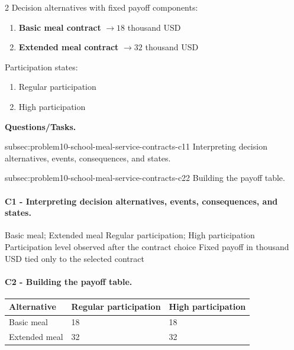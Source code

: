 	\begin{multicols}{2}
		Decision alternatives with fixed payoff components:
		\begin{enumerate}[label=\arabic*.]
			\item \textbf{Basic meal contract} $\to 18$ thousand USD
			\item \textbf{Extended meal contract} $\to 32$ thousand USD
		\end{enumerate}

			\columnbreak

		Participation states:
		\begin{enumerate}[label=\arabic*.]
			\item Regular participation
			\item High participation
		\end{enumerate}
	\end{multicols}

	\textbf{Questions/Tasks.}
	\begin{enumerate}
		\CriterionTask
		{subsec:problem10-school-meal-service-contracts-c1}{1}
		{Interpreting decision alternatives, events, consequences, and states.}

		\CriterionTask
		{subsec:problem10-school-meal-service-contracts-c2}{2}
		{Building the payoff table.}
	\end{enumerate}

	\paragraph*{C1 - Interpreting decision alternatives, events, consequences, and states.}
	\label{subsec:problem10-school-meal-service-contracts-c1}
	\DecisionElementsTable
	{Basic meal; Extended meal}
	{Regular participation; High participation}
	{Participation level observed after the contract choice}
	{Fixed payoff in thousand USD tied only to the selected contract}


	\paragraph*{C2 - Building the payoff table.}
	\label{subsec:problem10-school-meal-service-contracts-c2}
	\begin{center}
		\begin{tabular}{lll}
			\toprule
			Alternative & Regular participation & High participation \\
			\midrule
			Basic meal & 18 & 18 \\
			Extended meal & 32 & 32 \\
			\bottomrule
		\end{tabular}
	\end{center}


